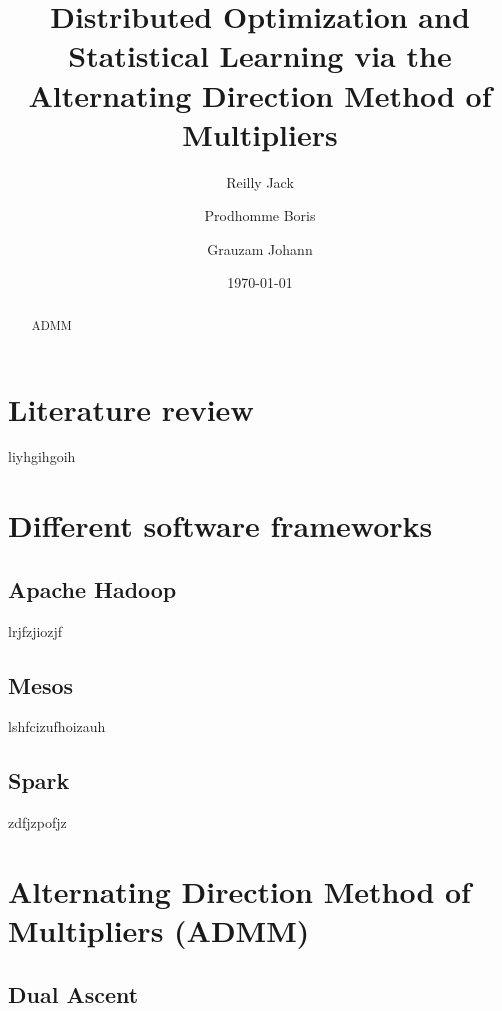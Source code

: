 \documentclass{article}
\begin{document}
\title{Distributed Optimization and Statistical Learning via the Alternating Direction Method of Multipliers}       
\author{Reilly Jack\and Prodhomme Boris\and Grauzam Johann\\ }       
\date{\today}         
\maketitle

\begin{abstract}

	ADMM \cite{ref1}
	
\end{abstract}

\section{Literature review}
 \label{Literature review}
 
	liyhgihgoih

\section{Different software frameworks}
 \label{Different software frameworks}

\subsection{Apache Hadoop}
	\label{Apache Hadoop}
	
	lrjfzjiozjf
	
\subsection{Mesos}
	\label{Mesos}
	
	lshfcizufhoizauh	
	
\subsection{Spark}
	\label{Spark}
	
	zdfjzpofjz


\section{Alternating Direction Method of Multipliers (ADMM)}
	\label{Alternating Direction Method of Multipliers (ADMM)}
	
\subsection{Dual Ascent}
	\label{Dual Ascent}
	
\end{document}
